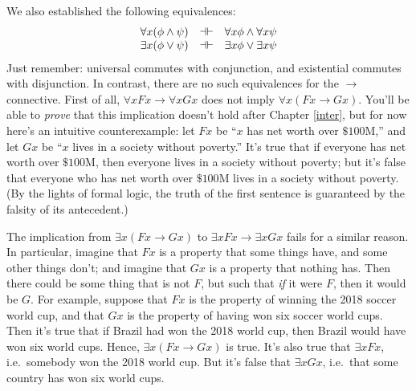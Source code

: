 We also established the following equivalences:
\[ \begin{array}{r c l}
     \forall x(\phi \wedge \psi ) & \dashv\vdash & \forall x\phi
                                                   \wedge \forall x
                                                   \psi  \\
     \exists x(\phi \vee \psi ) & \dashv\vdash & \exists x\phi
                                                   \vee \exists x\psi
                                                   \end{array} \]
Just remember: universal commutes with conjunction, and existential
commutes with disjunction.   In contrast, there are no such equivalences for the $\to$
connective.  First of all, $\forall xFx\to \forall xGx$ does not imply $\forall
x(Fx\to Gx)$.  You'll be able to {\it prove} that this implication
doesn't hold after Chapter \ref{inter}, but for now here's an
intuitive counterexample: let $Fx$ be ``$x$ has net worth over $\$100$M,'' and let $Gx$ be ``$x$ lives in a society
without poverty.''  It's true that if everyone has net worth over $\$100$M,
then everyone lives in a society without poverty; but it's false that everyone
who has net worth over $\$100$M lives in a society without poverty.
(By the lights of formal logic, the truth of the first sentence is
guaranteed by the falsity of its antecedent.)

The implication from $\exists x(Fx\to Gx)$ to
$\exists xFx\to \exists xGx$ fails for a similar reason.  In
particular, imagine that $Fx$ is a property that some things have, and
some other things don't; and imagine that $Gx$ is a property that
nothing has.  Then there could be some thing that is not $F$, but such
that {\it if} it were $F$, then it would be $G$.  For example, suppose
that $Fx$ is the property of winning the 2018 soccer world cup, and
that $Gx$ is the property of having won six soccer world cups.  Then
it's true that if Brazil had won the 2018 world cup, then Brazil would
have won six world cups.  Hence, $\exists x(Fx\to Gx)$ is true.  It's
also true that $\exists xFx$, i.e.\ somebody won the 2018 world cup.
But it's false that $\exists xGx$, i.e.\ that some country has won six
world cups.

